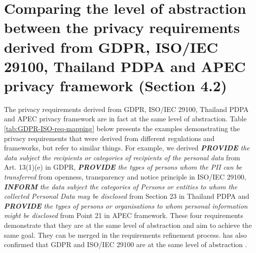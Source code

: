 \documentclass{article}
\begin{document}
\newpage
\section{Comparing the level of abstraction between the privacy requirements derived from GDPR, ISO/IEC 29100, Thailand PDPA and APEC privacy framework (Section 4.2)}

The privacy requirements derived from GDPR, ISO/IEC 29100, Thailand PDPA and APEC privacy framework are in fact at the same level of abstraction. Table \ref{tab:GDPR-ISO-req-mapping} below presents the examples demonstrating the privacy requirements that were derived from different regulations and frameworks, but refer to similar things. For example, we derived \textit{\textbf{PROVIDE} the data subject the recipients or categories of recipients of the personal data} from Art. 13(1)(e) in GDPR, \textit{\textbf{PROVIDE} the types of persons whom the PII can be transferred} from openness, transparency and notice principle in ISO/IEC 29100, \textit{\textbf{INFORM} the data subject the categories of Persons or entities to whom the collected Personal Data may be disclosed} from Section 23 in Thailand PDPA and \textit{\textbf{PROVIDE} the types of persons or organisations to whom personal information might be disclosed} from Point 21 in APEC framework. These four requirements demonstrate that they are at the same level of abstraction and aim to achieve the same goal. They can be merged in the requirements refinement process. \citeauthor{Meis} has also confirmed that GDPR and ISO/IEC 29100 are at the same level of abstraction \cite{Meis}. 
\end{document}
